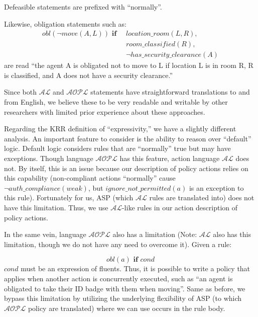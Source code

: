 Defeasible statements are prefixed with ``normally''.

Likewise, obligation statements such as:
\begin{equation}
\begin{split}
    obl(\neg move(A, L)) \textbf{ if } \
        & location\_room(L, R), \\
        & room\_classified(R), \\
        & \neg has\_security\_clearance(A)
\end{split}
\end{equation}
are read ``the agent A is obligated not to move to L if location L is in room R, R is classified, and A does not have a security clearance.''

Since both $\mathcal{AL}$ and $\mathcal{AOPL}$ statements have straightforward translations to and from English, we believe these to be very readable and writable by other researchers with limited prior experience about these approaches.

Regarding the KRR definition of ``expressivity,'' we have a slightly different analysis.
An important feature to consider is the ability to reason over ``default'' logic.
Default logic considers rules that are ``normally'' true but may have exceptions.
Though language $\mathcal{AOPL}$ has this feature, action language $\mathcal{AL}$ does not.
By itself, this is an issue because our description of policy actions relies on this capability (non-compliant actions ``normally'' cause $\neg auth\_compliance(weak)$, but $ignore\_not\_permitted(a)$ is an exception to this rule).
Fortunately for us, ASP (which $\mathcal{AL}$ rules are translated into) does not have this limitation.
Thus, we use $\mathcal{AL}$-like rules in our action description of policy actions.

In the same vein, language $\mathcal{AOPL}$ also has a limitation (Note: $\mathcal{AL}$ also has this limitation, though we do not have any need to overcome it).
Given a rule:

\begin{equation}
    obl(a) \textbf{ if } cond
\end{equation}
$cond$ must be an expression of fluents.
Thus, it is possible to write a policy that applies when another action is concurrently executed, such as ``an agent is obligated to take their ID badge with them when moving''.
Same as before, we bypass this limitation by utilizing the underlying flexibility of ASP (to which $\mathcal{AOPL}$ policy are translated) where we can use occurs in the rule body.


